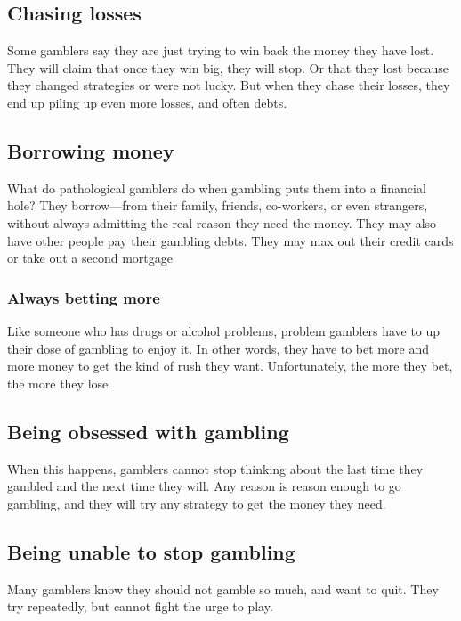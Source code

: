 \documentclass{article}
\begin{document}
\subsection{Chasing losses}

Some gamblers say they are just trying to win back the money they have lost. They will claim that once they win big, they will stop. Or that they lost because they changed strategies or were not lucky. But when they chase their losses, they end up piling up even more losses, and often debts.

\subsection{Borrowing money}

What do pathological gamblers do when gambling puts them into a financial hole? They borrow—from their family, friends, co-workers, or even strangers, without always admitting the real reason they need the money. They may also have other people pay their gambling debts. They may max out their credit cards or take out a second mortgage

\subsubsection{Always betting more}

Like someone who has drugs or alcohol problems, problem gamblers have to up their dose of gambling to enjoy it. In other words, they have to bet more and more money to get the kind of rush they want. Unfortunately, the more they bet, the more they lose

\subsection{Being obsessed with gambling}

When this happens, gamblers cannot stop thinking about the last time they gambled and the next time they will. Any reason is reason enough to go gambling, and they will try any strategy to get the money they need.

\subsection{Being unable to stop gambling}

Many gamblers know they should not gamble so much, and want to quit. They try repeatedly, but cannot fight the urge to play.
\end{document}
